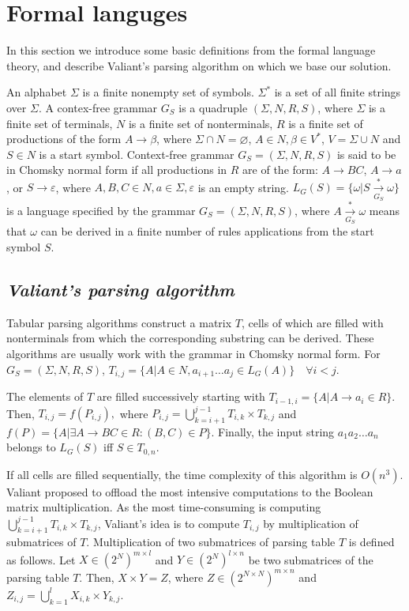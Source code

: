 \section{\bf Formal languges}

In this section we introduce some basic definitions from the formal language theory, and describe Valiant's parsing algorithm on which we base our solution.

An alphabet $\Sigma$ is a finite nonempty set of symbols.
$\Sigma^{*}$ is a set of all finite strings over $\Sigma$.
A contex-free grammar $G_S$ is a quadruple $(\Sigma, N, R, S)$, where $\Sigma$ is a finite set of terminals, $N$ is a finite set of nonterminals, $R$ is a finite set of productions of the form $A \rightarrow \beta$, where $\Sigma \cap N = \varnothing$, $A \in N, \beta \in V^{*}$, $V = \Sigma \cup N$ and $S \in N$ is a start symbol.
Context-free grammar $G_S = (\Sigma, N, R, S)$ is said to be in Chomsky normal form if all productions in $R$ are of the form: $A \rightarrow BC$, $A \rightarrow a$, or $S \rightarrow \varepsilon$, where $A, B, C \in N, a \in \Sigma, \varepsilon$ is an empty string.
$L_{G}(S) = \{ \omega | S\xrightarrow[G_S]{*} \omega\}$ is a language specified by the grammar $G_{S} = (\Sigma, N, R, S)$, where $A \xrightarrow[G_S]{*} \omega$ means that $\omega$ can be derived in a finite number of rules applications from the start symbol $S$.

\subsection{\bf \it Valiant's parsing algorithm}

Tabular parsing algorithms construct a matrix $T$, cells of which are filled with nonterminals from which the corresponding substring can be derived. 
These algorithms are usually work with the grammar in Chomsky normal form.
For $G_S=(\Sigma, N, R, S)$, $T_{i, j} =  \{ A | A \in N, a_{i + 1} \dots a_{j} \in L_{G}(A)\} \quad \forall i < j$.

The elements of $T$ are filled successively starting with $T_{i - 1, i} = \{ A | A \rightarrow a_{i} \in R\}.$
Then, $T_{i, j} = f(P_{i, j}),$ where
$P_{i, j} = \bigcup\limits_{k = i + 1}^{j - 1} T_{i,k} \times T_{k, j}$ and
$f(P) = \{A | \exists A \rightarrow BC \in R : (B, C) \in P\}.$
Finally, the input string $a_{1}a_{2} \dots a_{n}$ belongs to $L_{G}(S)$ iff $S \in T_{0, n}$.

If all cells are filled sequentially, the time complexity of this algorithm is $O(n^3)$.
Valiant proposed to offload the most intensive computations to the Boolean matrix multiplication. 
As the most time-consuming is computing $\bigcup\limits_{k = i + 1}^{j - 1} T_{i, k} \times T_{k, j}$, Valiant's idea is to compute $T_{i, j}$ by multiplication of submatrices of $T$.
Multiplication of two submatrices of parsing table $T$ is defined as follows.
Let $X \in (2^N)^{m \times l}$ and $Y \in (2^N)^{l \times n}$ be two submatrices of the parsing table $T$. 
Then, $X \times Y = Z$, where $Z \in (2^{N \times N})^{m \times n}$ and $Z_{i, j} = \bigcup\limits_{k = 1}^{l} X_{i, k} \times Y_{k, j}$.


